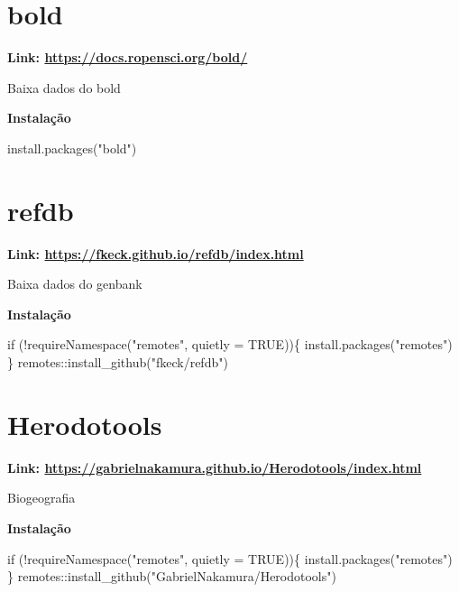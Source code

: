 \documentclass[
  letterpaper,
  DIV=11,
  numbers=noendperiod]{scrreprt}
\newenvironment{Shaded}{\begin{snugshade}}{\end{snugshade}}
\newcommand{\AttributeTok}[1]{\textcolor[rgb]{0.40,0.45,0.13}{#1}}
\newcommand{\ConstantTok}[1]{\textcolor[rgb]{0.56,0.35,0.01}{#1}}
\newcommand{\ControlFlowTok}[1]{\textcolor[rgb]{0.00,0.23,0.31}{#1}}
\newcommand{\FunctionTok}[1]{\textcolor[rgb]{0.28,0.35,0.67}{#1}}
\newcommand{\NormalTok}[1]{\textcolor[rgb]{0.00,0.23,0.31}{#1}}
\newcommand{\SpecialCharTok}[1]{\textcolor[rgb]{0.37,0.37,0.37}{#1}}
\newcommand{\StringTok}[1]{\textcolor[rgb]{0.13,0.47,0.30}{#1}}
\begin{document}
\hypertarget{bold}{%
\section{bold}\label{bold}}

\textbf{Link: \url{https://docs.ropensci.org/bold/}}

Baixa dados do bold

\textbf{Instalação}

\begin{Shaded}
\begin{Highlighting}[]
\FunctionTok{install.packages}\NormalTok{(}\StringTok{"bold"}\NormalTok{)}
\end{Highlighting}
\end{Shaded}

\hypertarget{refdb}{%
\section{refdb}\label{refdb}}

\textbf{Link: \url{https://fkeck.github.io/refdb/index.html}}

Baixa dados do genbank

\textbf{Instalação}

\begin{Shaded}
\begin{Highlighting}[]
\ControlFlowTok{if}\NormalTok{ (}\SpecialCharTok{!}\FunctionTok{requireNamespace}\NormalTok{(}\StringTok{"remotes"}\NormalTok{, }\AttributeTok{quietly =} \ConstantTok{TRUE}\NormalTok{))\{}
    \FunctionTok{install.packages}\NormalTok{(}\StringTok{"remotes"}\NormalTok{)}
\NormalTok{  \}}
\NormalTok{remotes}\SpecialCharTok{::}\FunctionTok{install\_github}\NormalTok{(}\StringTok{"fkeck/refdb"}\NormalTok{)}
\end{Highlighting}
\end{Shaded}

\hypertarget{herodotools}{%
\section{Herodotools}\label{herodotools}}

\textbf{Link:
\url{https://gabrielnakamura.github.io/Herodotools/index.html}}

Biogeografia

\textbf{Instalação}

\begin{Shaded}
\begin{Highlighting}[]
\ControlFlowTok{if}\NormalTok{ (}\SpecialCharTok{!}\FunctionTok{requireNamespace}\NormalTok{(}\StringTok{"remotes"}\NormalTok{, }\AttributeTok{quietly =} \ConstantTok{TRUE}\NormalTok{))\{}
    \FunctionTok{install.packages}\NormalTok{(}\StringTok{"remotes"}\NormalTok{)}
\NormalTok{  \}}
\NormalTok{remotes}\SpecialCharTok{::}\FunctionTok{install\_github}\NormalTok{(}\StringTok{"GabrielNakamura/Herodotools"}\NormalTok{)}
\end{Highlighting}
\end{Shaded}
\end{document}
